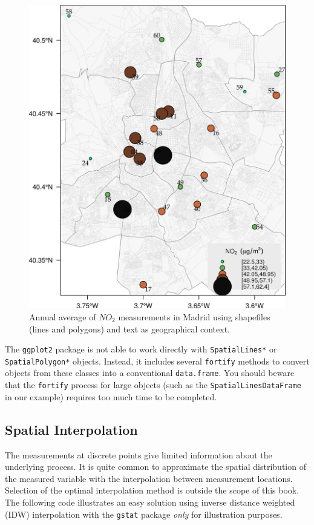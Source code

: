 \documentclass[smallroyalvopaper]{memoir}
\begin{document}
\begin{figure}[htb]
\centering
\includegraphics[width=.9\linewidth]{figs/airMadrid.png}
\caption{\label{fig:airMadrid}Annual average of $NO_2$ measurements in Madrid using shapefiles (lines and polygons) and text as geographical context.}
\end{figure}

The \texttt{ggplot2} package is not able to work directly with
\texttt{SpatialLines*} or \texttt{SpatialPolygon*} objects. Instead, it includes
several \texttt{fortify} methods to convert objects from these classes into a
conventional \texttt{data.frame}. You should beware that the \texttt{fortify}
process for large objects (such as the \texttt{SpatialLinesDataFrame} in our
example) requires too much time to be completed.

\subsection{Spatial Interpolation}
\label{sec-1-5}
The measurements at discrete points give limited information about the
underlying process. It is quite common to approximate the spatial
distribution of the measured variable with the interpolation between
measurement locations. Selection of the optimal interpolation method
is outside the scope of this book. The following code illustrates an
easy solution using inverse distance weighted (IDW) interpolation with
the \texttt{gstat} package \cite{Pebesma2004} \emph{only} for illustration
purposes.
\end{document}
